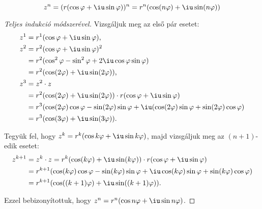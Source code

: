 \begin{blueBox}
  \[
    z^n
    = (r(\cos \varphi + \iu \sin \varphi))^n
    = r^n (\cos (n \varphi) + \iu \sin (n \varphi))
  \]

  \begin{proof}[Teljes indukció módszerével]
    Vizsgáljuk meg az első pár esetet:
    \begin{align*}
      z^1 & = r^1 (\cos \varphi + \iu \sin \varphi) \text,                                                                                         \\
      z^2 & = r^2 (\cos \varphi + \iu \sin \varphi)^2                                                                                              \\
          & = r^2 (\cos^2 \varphi - \sin^2 \varphi + 2\iu \cos \varphi \sin \varphi)                                                               \\
          & = r^2 (\cos (2\varphi) + \iu \sin (2\varphi)) \text,                                                                                   \\
      z^3 & = z^2 \cdot z                                                                                                                          \\
          & = r^2 (\cos (2\varphi) + \iu \sin (2\varphi)) \cdot r(\cos \varphi + \iu \sin \varphi)                                                 \\
          & = r^3 (\cos (2\varphi) \cos \varphi - \sin (2\varphi) \sin \varphi + \iu (\cos (2\varphi) \sin \varphi + \sin (2\varphi) \cos \varphi) \\
          & = r^3 (\cos (3\varphi) + \iu \sin (3\varphi)) \text.
    \end{align*}

    Tegyük fel, hogy $z^k = r^k (\cos k\varphi + \iu \sin k\varphi)$, majd
    vizsgáljuk meg az $(n + 1)$-edik esetet:
    \begin{align*}
      z^{k + 1}
       & = z^k \cdot z
      = r^k (\cos (k\varphi) + \iu \sin (k\varphi)) \cdot r(\cos \varphi + \iu \sin \varphi)
      \\
       & = r^{k + 1} (\cos (k\varphi) \cos \varphi - \sin (k\varphi) \sin \varphi + \iu \cos (k\varphi) \sin \varphi + \sin (k\varphi) \cos \varphi)
      \\
       & = r^{k + 1} (\cos ((k + 1)\varphi) + \iu \sin ((k + 1)\varphi))
      \text.
    \end{align*}

    Ezzel bebizonyítottuk, hogy $z^n = r^n (\cos n\varphi + \iu \sin n\varphi)$.
  \end{proof}
\end{blueBox}

